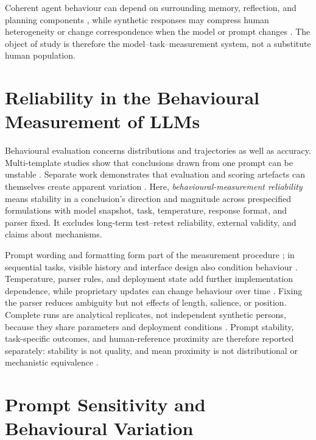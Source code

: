 \documentclass[logo,msc,inf]{infthesis}       %
\begin{document}
Coherent agent behaviour can depend on surrounding memory, reflection, and planning components \cite{Park2023GenerativeAgents}, while synthetic responses may compress human heterogeneity or change correspondence when the model or prompt changes \cite{Dillion2023ReplaceParticipants,Bisbee2024SyntheticSurveyData}. The object of study is therefore the model--task--measurement system, not a substitute human population.

\section{Reliability in the Behavioural Measurement of LLMs}

Behavioural evaluation concerns distributions and trajectories as well as accuracy. Multi-template studies show that conclusions drawn from one prompt can be unstable \cite{Sclar2024PromptFormatting,Mizrahi2024MultiPrompt}. Separate work demonstrates that evaluation and scoring artefacts can themselves create apparent variation \cite{Hua2025FlawArtifact}. Here, \emph{behavioural-measurement reliability} means stability in a conclusion's direction and magnitude across prespecified formulations with model snapshot, task, temperature, response format, and parser fixed. It excludes long-term test--retest reliability, external validity, and claims about mechanisms.

Prompt wording and formatting form part of the measurement procedure \cite{Sclar2024PromptFormatting}; in sequential tasks, visible history and interface design also condition behaviour \cite{Loya2023PromptSensitivityDecision}. Temperature, parser rules, and deployment state add further implementation dependence, while proprietary updates can change behaviour over time \cite{Chen2024ChatGPTBehavior}. Fixing the parser reduces ambiguity but not effects of length, salience, or position. Complete runs are analytical replicates, not independent synthetic persons, because they share parameters and deployment conditions \cite{Dillion2023ReplaceParticipants,Bisbee2024SyntheticSurveyData}. Prompt stability, task-specific outcomes, and human-reference proximity are therefore reported separately: stability is not quality, and mean proximity is not distributional or mechanistic equivalence \cite{Lin2025SixFallacies}.

\section{Prompt Sensitivity and Behavioural Variation}
\end{document}
